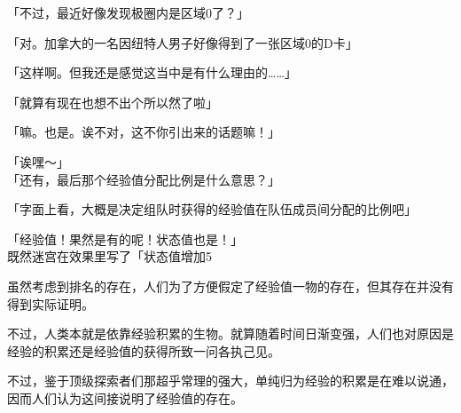 「不过，最近好像发现极圈内是区域0了？」

「对。加拿大的一名因纽特人男子好像得到了一张区域0的D卡」

「这样啊。但我还是感觉这当中是有什么理由的……」

「就算有现在也想不出个所以然了啦」

「嘛。也是。诶不对，这不你引出来的话题嘛！」

「诶嘿～」\\

「还有，最后那个经验值分配比例是什么意思？」

「字面上看，大概是决定组队时获得的经验值在队伍成员间分配的比例吧」

「经验值！果然是有的呢！状态值也是！」\\

既然迷宫在效果里写了「状态值增加5%

虽然考虑到排名的存在，人们为了方便假定了经验值一物的存在，但其存在并没有得到实际证明。

不过，人类本就是依靠经验积累的生物。就算随着时间日渐变强，人们也对原因是经验的积累还是经验值的获得所致一问各执己见。

不过，鉴于顶级探索者们那超乎常理的强大，单纯归为经验的积累是在难以说通，因而人们认为这间接说明了经验值的存在。\\

